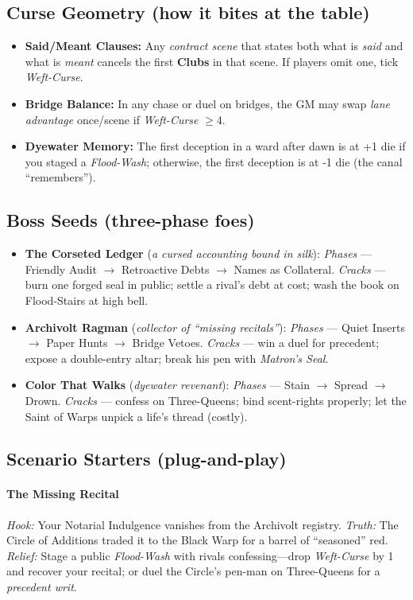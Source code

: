 \subsection*{Curse Geometry (how it bites at the table)}
\begin{itemize}
  \item \textbf{Said/Meant Clauses:} Any \emph{contract scene} that states both what is \emph{said} and what is \emph{meant} cancels the first \textbf{Clubs} in that scene. If players omit one, tick \emph{Weft-Curse}.
  \item \textbf{Bridge Balance:} In any chase or duel on bridges, the GM may swap \emph{lane advantage} once/scene if \emph{Weft-Curse} \(\geq 4\).
  \item \textbf{Dyewater Memory:} The first deception in a ward after dawn is at +1 die if you staged a \emph{Flood-Wash}; otherwise, the first deception is at -1 die (the canal “remembers”).
\end{itemize}

\subsection*{Boss Seeds (three-phase foes)}
\begin{itemize}
  \item \textbf{The Corseted Ledger} (\emph{a cursed accounting bound in silk}): \emph{Phases} — Friendly Audit \(\rightarrow\) Retroactive Debts \(\rightarrow\) Names as Collateral. \emph{Cracks} — burn one forged seal in public; settle a rival’s debt at cost; wash the book on Flood-Stairs at high bell.
  \item \textbf{Archivolt Ragman} (\emph{collector of “missing recitals”}): \emph{Phases} — Quiet Inserts \(\rightarrow\) Paper Hunts \(\rightarrow\) Bridge Vetoes. \emph{Cracks} — win a duel for precedent; expose a double-entry altar; break his pen with \emph{Matron’s Seal}.
  \item \textbf{Color That Walks} (\emph{dyewater revenant}): \emph{Phases} — Stain \(\rightarrow\) Spread \(\rightarrow\) Drown. \emph{Cracks} — confess on Three-Queens; bind scent-rights properly; let the Saint of Warps unpick a life’s thread (costly).
\end{itemize}

\subsection*{Scenario Starters (plug-and-play)}
\paragraph{The Missing Recital}
\emph{Hook:} Your Notarial Indulgence vanishes from the Archivolt registry.  
\emph{Truth:} The Circle of Additions traded it to the Black Warp for a barrel of “seasoned” red.  
\emph{Relief:} Stage a public \emph{Flood-Wash} with rivals confessing—drop \emph{Weft-Curse} by 1 and recover your recital; or duel the Circle’s pen-man on Three-Queens for a \emph{precedent writ}.

